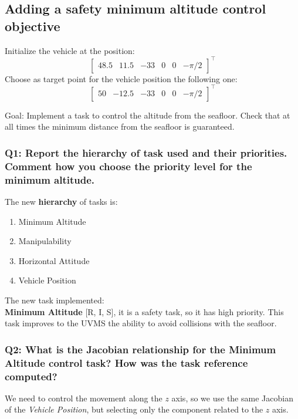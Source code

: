 \documentclass{article}
\begin{document}
\subsection{Adding a safety minimum altitude control objective}
Initialize the vehicle at the position:
\begin{displaymath}
\begin{bmatrix} 48.5 & 11.5 & -33 & 0 & 0 &-\pi/2\end{bmatrix}^\top
\end{displaymath} 
Choose as target point for the vehicle position the following one:
\begin{displaymath}
\begin{bmatrix} 50 & -12.5 & -33 & 0 & 0 &-\pi/2 \end{bmatrix}^\top
\end{displaymath}

Goal: Implement a task to control the altitude from the seafloor. Check that at all times the minimum distance from the seafloor is guaranteed.

\subsubsection{Q1: Report the hierarchy of task used and their priorities. Comment how you choose the priority level for the minimum altitude.}

\noindent
\vspace{5px}
The new \textbf{hierarchy} of tasks is:
\begin{enumerate}
	\item Minimum Altitude
	\item Manipulability
	\item Horizontal Attitude
	\item Vehicle Position
\end{enumerate}

\noindent
\vspace{5px}
The new task implemented: \\
\textbf{Minimum Altitude} [R, I, S], it is a safety task, so it has high priority. This task improves to the UVMS the ability to avoid collisions with the seafloor.

\subsubsection{Q2: What is the Jacobian relationship for the Minimum Altitude control task? How was the task reference computed?}
We need to control the movement along the $z$ axis, so we use the same Jacobian of the \textit{Vehicle Position}, but selecting only the component related to the $z$ axis.
\end{document}
